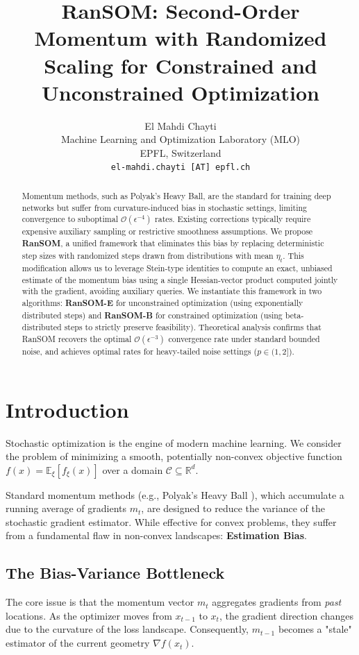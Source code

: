 \documentclass{article}
\title{RanSOM: Second-Order Momentum with Randomized Scaling for Constrained and Unconstrained Optimization}
\author{%
  El Mahdi Chayti \\
  Machine Learning and Optimization Laboratory (MLO) \\
  EPFL, Switzerland \\
  \texttt{el-mahdi.chayti [AT] epfl.ch} \\
}
\theoremstyle{plain}
\theoremstyle{definition}
\theoremstyle{remark}
\begin{document}
\maketitle



\begin{abstract}
Momentum methods, such as Polyak's Heavy Ball, are the standard for training deep networks but suffer from curvature-induced bias in stochastic settings, limiting convergence to suboptimal $\mathcal{O}(\epsilon^{-4})$ rates. Existing corrections typically require expensive auxiliary sampling or restrictive smoothness assumptions. We propose \textbf{RanSOM}, a unified framework that eliminates this bias by replacing deterministic step sizes with randomized steps drawn from distributions with mean $\eta_t$. This modification allows us to leverage Stein-type identities to compute an exact, unbiased estimate of the momentum bias using a single Hessian-vector product computed jointly with the gradient, avoiding auxiliary queries. We instantiate this framework in two algorithms: \textbf{RanSOM-E} for unconstrained optimization (using exponentially distributed steps) and \textbf{RanSOM-B} for constrained optimization (using beta-distributed steps to strictly preserve feasibility). Theoretical analysis confirms that RanSOM recovers the optimal $\mathcal{O}(\epsilon^{-3})$ convergence rate under standard bounded noise, and achieves optimal rates for heavy-tailed noise settings ($p \in (1, 2]$).
\end{abstract}
\section{Introduction}
\label{sec:intro}

Stochastic optimization is the engine of modern machine learning. We consider the problem of minimizing a smooth, potentially non-convex objective function $f(x) = \mathbb{E}_{\xi}[f_\xi(x)]$ over a domain $\mathcal{C} \subseteq \mathbb{R}^d$. 

Standard momentum methods (e.g., Polyak's Heavy Ball \citep{polyak1964}), which accumulate a running average of gradients $m_t$, are designed to reduce the variance of the stochastic gradient estimator. While effective for convex problems, they suffer from a fundamental flaw in non-convex landscapes: \textbf{Estimation Bias}.

\subsection{The Bias-Variance Bottleneck}
The core issue is that the momentum vector $m_t$ aggregates gradients from \textit{past} locations. As the optimizer moves from $x_{t-1}$ to $x_t$, the gradient direction changes due to the curvature of the loss landscape. Consequently, $m_{t-1}$ becomes a "stale" estimator of the current geometry $\nabla f(x_t)$.
\end{document}
